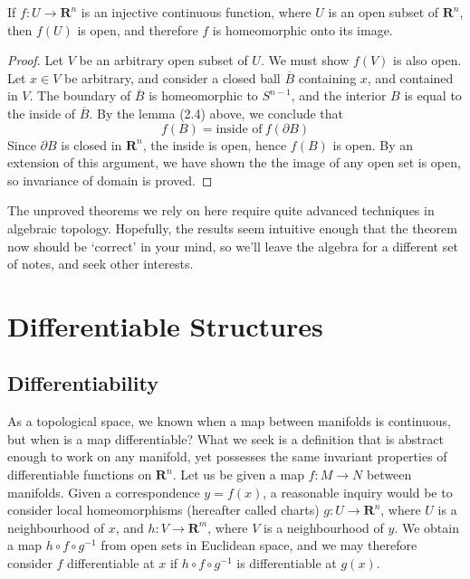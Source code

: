 \begin{theorem}
    If $f:U \to \mathbf{R}^n$ is an injective continuous function, where $U$ is an open subset of $\mathbf{R}^n$, then $f(U)$ is open, and therefore $f$ is homeomorphic onto its image.
\end{theorem}
\begin{proof}
    Let $V$ be an arbitrary open subset of $U$. We must show $f(V)$ is also open. Let $x \in V$ be arbitrary, and consider a closed ball $\overline{B}$ containing $x$, and contained in $V$. The boundary of $\overline{B}$ is homeomorphic to $S^{n-1}$, and the interior $B$ is equal to the inside of $\overline{B}$. By the lemma (2.4) above, we conclude that
    \[ f(B) = \text{inside of}\ f(\partial B) \]
    Since $\partial B$ is closed in $\mathbf{R}^n$, the inside is open, hence $f(B)$ is open. By an extension of this argument, we have shown the the image of any open set is open, so invariance of domain is proved.
\end{proof}

The unproved theorems we rely on here require quite advanced techniques in algebraic topology. Hopefully, the results seem intuitive enough that the theorem now should be `correct' in your mind, so we'll leave the algebra for a different set of notes, and seek other interests.








\chapter{Differentiable Structures}

\section{Differentiability}

As a topological space, we known when a map between manifolds is continuous, but when is a map differentiable? What we seek is a definition that is abstract enough to work on any manifold, yet possesses the same invariant properties of differentiable functions on $\mathbf{R}^n$. Let us be given a map $f:M \to N$ between manifolds. Given a correspondence $y = f(x)$, a reasonable inquiry would be to consider local homeomorphisms (hereafter called charts) $g:U \to \mathbf{R}^n$, where $U$ is a neighbourhood of $x$, and $h:V \to \mathbf{R}^m$, where $V$ is a neighbourhood of $y$. We obtain a map $h \circ f \circ g^{-1}$ from open sets in Euclidean space, and we may therefore consider $f$ differentiable at $x$ if $h \circ f \circ g^{-1}$ is differentiable at $g(x)$.

